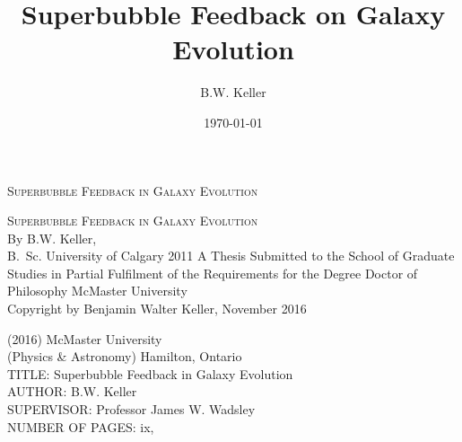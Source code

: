 \documentclass[letterpaper,12pt,twoside,openright]{report} %
\title{Superbubble Feedback on Galaxy Evolution}
\author{B.W. Keller}
\date{\today}
\begin{document}
\begin{titlepage} %
    \thispagestyle{empty}
    \vspace*{\fill}
    \begin{center}{\Large
    \textsc{Superbubble Feedback in Galaxy Evolution}}
    \end{center}
    \vspace*{\fill}
    \setcounter{page}{0} %
\end{titlepage}

\begin{titlepage} %
\thispagestyle{empty}
\centering
\vspace*{\fill} %
{\Large \textsc{Superbubble Feedback in Galaxy Evolution}\\
\vfill
    By {\sc B.W. Keller}, \\
    B.\ Sc. University of Calgary 2011}
\vfill
A Thesis Submitted to the School of Graduate Studies in Partial Fulfilment of
the Requirements for the Degree Doctor of Philosophy
\vfill%
McMaster University \\ \textcopyright{} Copyright by Benjamin Walter Keller, November 2016
\end{titlepage}
{ (2016) \hfill McMaster University \\
(Physics \& Astronomy) \hfill Hamilton, Ontario \\
TITLE: Superbubble Feedback in Galaxy Evolution\\
AUTHOR: B.W. Keller\\
SUPERVISOR: Professor James W. Wadsley\\
NUMBER OF PAGES: ix,~\pageref{LastPage}}
\end{document}
